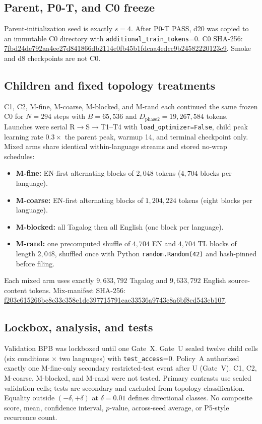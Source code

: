 \documentclass[11pt,a4paper]{article}
\newcommand{\sha}[1]{{\footnotesize\ttfamily\url{#1}}}
\begin{document}
\subsection{Parent, P0-T, and C0 freeze}
Parent-initialization seed is exactly $s=4$. After P0-T PASS, d20 was copied to an immutable C0 directory with \texttt{additional\_train\_tokens}=0. C0 SHA-256: \sha{7fbd24de792aa4ee27d841866db2114e0fb45b1fdcaa4edcc9b24582220123c9}. Smoke and d8 checkpoints are not C0.

\subsection{Children and fixed topology treatments}
C1, C2, M-fine, M-coarse, M-blocked, and M-rand each continued the same frozen C0 for $N=294$ steps with $B=65{,}536$ and $D_{\mathrm{phase2}}=19{,}267{,}584$ tokens.
Launches were serial R$\to$S$\to$T1--T4 with \texttt{load\_optimizer=False}, child peak learning rate $0.3\times$ the parent peak, warmup 14, and terminal checkpoint only.
Mixed arms share identical within-language streams and stored no-wrap schedules:
\begin{itemize}[leftmargin=1.6em,itemsep=0.25em]
\item \textbf{M-fine:} EN-first alternating blocks of $2{,}048$ tokens ($4{,}704$ blocks per language).
\item \textbf{M-coarse:} EN-first alternating blocks of $1{,}204{,}224$ tokens (eight blocks per language).
\item \textbf{M-blocked:} all Tagalog then all English (one block per language).
\item \textbf{M-rand:} one precomputed shuffle of $4{,}704$ EN and $4{,}704$ TL blocks of length $2{,}048$, shuffled once with Python \texttt{random.Random(42)} and hash-pinned before filing.
\end{itemize}
Each mixed arm uses exactly $9{,}633{,}792$ Tagalog and $9{,}633{,}792$ English source-content tokens. Mix-manifest SHA-256:\\
\sha{f203c615266bc8c33c358c1de397715791cae33536a9743c8a6bf8cd543cb107}.

\subsection{Lockbox, analysis, and tests}
Validation BPB was lockboxed until one Gate~X. Gate~U sealed twelve child cells (six conditions $\times$ two languages) with \texttt{test\_access}=0. Policy~A authorized exactly one M-fine-only secondary restricted-test event after U (Gate~V). C1, C2, M-coarse, M-blocked, and M-rand were not tested. Primary contrasts use sealed validation cells; tests are secondary and excluded from topology classification. Equality outside $(-\delta,+\delta)$ at $\delta=0.01$ defines directional classes. No composite score, mean, confidence interval, $p$-value, across-seed average, or P5-style recurrence count.
\end{document}
